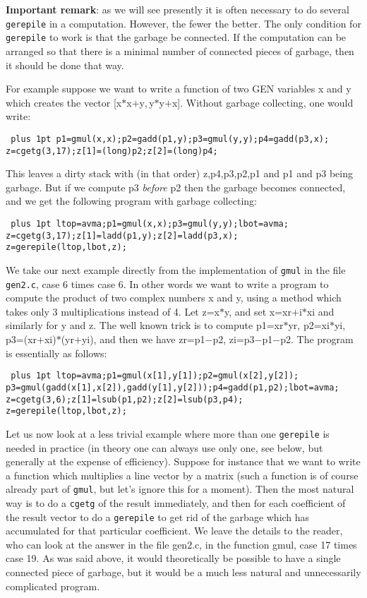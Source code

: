 {\bf Important remark}: as we will see presently it is often necessary
to do several {\tt gerepile} in a computation. However, the fewer the better.
The only condition for {\tt gerepile} to work is that the garbage be connected.
If the computation can be arranged so that there is a minimal number of
connected pieces of garbage, then it should be done that way.

For example suppose we want to write a function of two GEN variables x and y
which creates the vector [x$*$x$+$y$,$y$*$y$+$x]. Without garbage collecting,
one would write:

{\tt \obeylines\parskip=0pt plus 1pt
\hbox{}
p1=gmul(x,x);p2=gadd(p1,y);p3=gmul(y,y);p4=gadd(p3,x);
z=cgetg(3,17);z[1]=(long)p2;z[2]=(long)p4;}

This leaves a dirty stack with (in that order) z,p4,p3,p2,p1 and p1 and p3
being garbage. But if we compute p3 {\it before \/} p2 then the garbage
becomes connected, and we get the following program with garbage 
collecting:

{\tt \obeylines\parskip=0pt plus 1pt
\hbox{}
ltop=avma;p1=gmul(x,x);p3=gmul(y,y);lbot=avma;
z=cgetg(3,17);z[1]=ladd(p1,y);z[2]=ladd(p3,x);
z=gerepile(ltop,lbot,z);}

We take our next example directly from the implementation of {\tt gmul} in the
file {\tt gen2.c}, case 6 times case 6. In other words
we want to write a program to compute the product of two complex numbers
x and y, using a method which takes only 3 multiplications instead
of 4. Let z=x$*$y, and set x=xr$+$i$*$xi and similarly for y and z. The well known
trick is to compute p1=xr$*$yr, p2=xi$*$yi, p3=(xr$+$xi)$*$(yr$+$yi), and then we
have zr=p1$-$p2, zi=p3$-$p1$-$p2. The program is essentially as follows:

{\tt \obeylines\parskip=0pt plus 1pt
\hbox{}
ltop=avma;p1=gmul(x[1],y[1]);p2=gmul(x[2],y[2]);
p3=gmul(gadd(x[1],x[2]),gadd(y[1],y[2]));p4=gadd(p1,p2);lbot=avma;
z=cgetg(3,6);z[1]=lsub(p1,p2);z[2]=lsub(p3,p4);
z=gerepile(ltop,lbot,z);}

Let us now look at a less trivial example where more than one {\tt gerepile} is
needed in practice (in theory one can always use only one, see below, but
generally at the expense of efficiency). Suppose for instance that we want
to write a function which multiplies a line vector by a matrix (such a
function is of course already part of {\tt gmul}, but let's ignore this for a
moment). Then the most natural way is to do a {\tt cgetg} of the result
immediately, and then for each coefficient of the result vector to do
a {\tt gerepile} to get rid of the garbage which has accumulated for that
particular coefficient. We leave the details to the reader, who can
look at the answer in the file gen2.c, in the function gmul, case 17 times
case 19. As was said above, it would theoretically be possible to have
a single connected piece of garbage, but it would be a much less natural
and unnecessarily complicated program.

